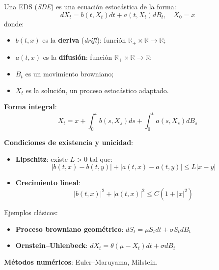 \begin{f}
	
	Una EDS (\emph{SDE}) es una ecuación estocástica de la forma:
	\[
	dX_t = b(t, X_t) dt + a(t, X_t) dB_t, \quad X_0 = x
	\]
	donde:
	\begin{itemize}
		\item \(b(t,x)\) es la \textbf{deriva} (\emph{drift}): función \(\mathbb{R}_+ \times \mathbb{R} \to \mathbb{R}\);
		\item \(a(t,x)\) es la \textbf{difusión}: función \(\mathbb{R}_+ \times \mathbb{R} \to \mathbb{R}\);
		\item \(B_t\) es un movimiento browniano;
		\item \(X_t\) es la solución, un proceso estocástico adaptado.
	\end{itemize}
	
	\textbf{Forma integral}:
	\[
	X_t = x + \int_0^t b(s, X_s) ds + \int_0^t a(s, X_s) dB_s
	\]
	
	\textbf{Condiciones de existencia y unicidad}:
	\begin{itemize}
		\item \textbf{Lipschitz}: existe \(L > 0\) tal que:
		\[
		|b(t,x) - b(t,y)| + |a(t,x) - a(t,y)| \leq L |x - y|
		\]
		\item \textbf{Crecimiento lineal}:
		\[
		|b(t,x)|^2 + |a(t,x)|^2 \leq C(1 + |x|^2)
		\]
	\end{itemize}
	
	Ejemplos clásicos:
	\begin{itemize}
		\item \textbf{Proceso browniano geométrico}: \(dS_t = \mu S_t dt + \sigma S_t dB_t\)
		\item \textbf{Ornstein–Uhlenbeck}: \(dX_t = \theta(\mu - X_t) dt + \sigma dB_t\)
	\end{itemize}
	
	\textbf{Métodos numéricos}: Euler–Maruyama, Milstein.
	
\end{f}


